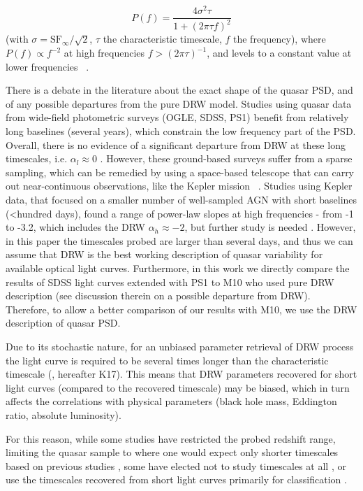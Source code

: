 \documentclass[twocolumn]{aastex62}
\begin{document}
\begin{equation}
	P(f) = \frac{4\sigma^{2}\tau}{1+(2 \pi \tau f)^{2}}
\end{equation}
(with $\sigma = \mathrm{SF}_{\infty} / \sqrt{2}$, $\tau$ the characteristic timescale, $f$ the frequency), where $P(f) \propto f^{-2}$  at high frequencies $f > (2\pi \tau)^{-1}$, and levels to a constant value at lower frequencies ~\citep{kelly2014}. 

There is a debate in the literature about the exact shape of the quasar PSD, and of any possible  departures from the pure DRW model. Studies using quasar data from wide-field photometric surveys (OGLE, SDSS, PS1) benefit from relatively long baselines (several years), which constrain the low frequency part of the PSD. Overall, there is no evidence of a significant departure from DRW at these long timescales, i.e. $\alpha_{l} \approx 0$ \citep{zu2013, simm2016, kozlowski2016b, caplar2017, guo2017, sun2018}. However, these ground-based surveys suffer from a sparse sampling, which can be remedied by using a space-based telescope that can carry out near-continuous observations, like the Kepler mission ~\citep{borucki2010}. Studies using Kepler data, that focused on a smaller number of well-sampled AGN with short baselines (<hundred days), found a range of power-law slopes at high frequencies - from -1 to -3.2, which includes the DRW $\alpha_{h} \approx -2$, but further study is needed \citep{mushotzky2011,edelson2014,aranzana2018,smith2018}. However, in this paper the timescales probed are larger than several days, and thus we can assume that DRW is the best working description of quasar variability for available optical light curves. Furthermore, in this work we directly compare the results of SDSS light curves extended with PS1 to M10 who used pure DRW description (see discussion therein on a possible departure from DRW). Therefore, to allow a better comparison of our results with M10, we  use the DRW description of quasar PSD. 

Due to its stochastic nature, for an unbiased parameter retrieval of DRW process the light curve is required to be several times longer than the characteristic timescale (\citealt{kozlowski2010, kozlowski2017a}, hereafter K17). This means that DRW parameters recovered for short light curves (compared to the recovered timescale) may be biased, which in turn affects the correlations with physical parameters (black hole mass, Eddington ratio, absolute luminosity). 

For this reason, while some studies have restricted the probed redshift range, limiting the quasar sample to where one would expect only shorter timescales based on previous studies \citep{sun2018, guo2017, kelly2013,simm2016}, some have elected not to study timescales at all \citep{sun2018,sanchez2018}, or use the timescales recovered from short light curves primarily for classification \citep{hernitschek2016}.
\end{document}
